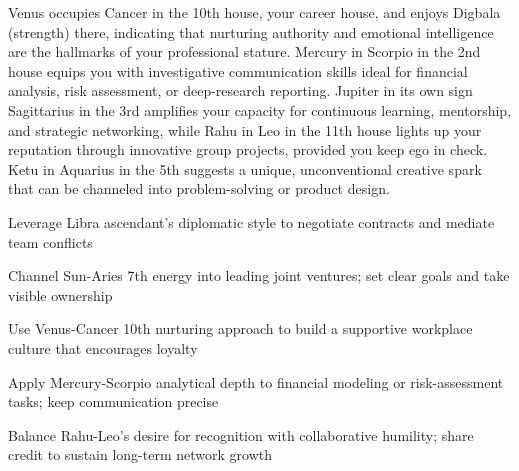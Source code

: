 {\fontsize{9}{13}\selectfont Venus occupies Cancer in the 10th house, your career house, and enjoys Digbala (strength) there, indicating that nurturing authority and emotional intelligence are the hallmarks of your professional stature. Mercury in Scorpio in the 2nd house equips you with investigative communication skills ideal for financial analysis, risk assessment, or deep-research reporting. Jupiter in its own sign Sagittarius in the 3rd amplifies your capacity for continuous learning, mentorship, and strategic networking, while Rahu in Leo in the 11th house lights up your reputation through innovative group projects, provided you keep ego in check. Ketu in Aquarius in the 5th suggests a unique, unconventional creative spark that can be channeled into problem-solving or product design.}\par\vspace{1.8mm}

\begin{diamondlist}
  \item {\fontsize{8.5}{12}\selectfont Leverage Libra ascendant's diplomatic style to negotiate contracts and mediate team conflicts}
  \item {\fontsize{8.5}{12}\selectfont Channel Sun-Aries 7th energy into leading joint ventures; set clear goals and take visible ownership}
  \item {\fontsize{8.5}{12}\selectfont Use Venus-Cancer 10th nurturing approach to build a supportive workplace culture that encourages loyalty}
  \item {\fontsize{8.5}{12}\selectfont Apply Mercury-Scorpio analytical depth to financial modeling or risk-assessment tasks; keep communication precise}
  \item {\fontsize{8.5}{12}\selectfont Balance Rahu-Leo's desire for recognition with collaborative humility; share credit to sustain long-term network growth}
\end{diamondlist}


